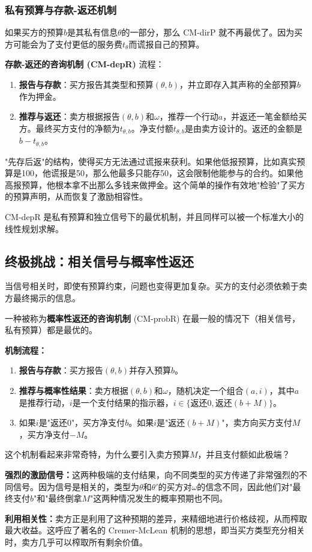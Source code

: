 \subsubsection{私有预算与存款-返还机制}

如果买方的预算$b$是其私有信息$\theta$的一部分，那么 CM-dirP 就不再最优了。因为买方可能会为了支付更低的服务费$t_\theta$而谎报自己的预算。

\textbf{存款-返还的咨询机制 (CM-depR)} 流程：

\begin{enumerate}
    \item \textbf{报告与存款}：买方报告其类型和预算$(\theta,b)$，并立即存入其声称的全部预算$b$作为押金。
    \item \textbf{推荐与返还}：卖方根据报告$(\theta,b)$和$\omega$，推荐一个行动$a$，并返还一笔金额给买方。最终买方支付的净额为$t_{\theta,b}$。净支付额$t_{\theta,b}$是由卖方设计的。返还的金额是$b-t_{\theta,b}$。
\end{enumerate}

"先存后返"的结构，使得买方无法通过谎报来获利。如果他低报预算，比如真实预算是100，他谎报是50，那么他最多只能存50，这会限制他能参与的合约。如果他高报预算，他根本拿不出那么多钱来做押金。这个简单的操作有效地"检验"了买方的预算声明，从而恢复了激励相容性。

CM-depR 是私有预算和独立信号下的最优机制，并且同样可以被一个标准大小的线性规划求解。

\subsection{终极挑战：相关信号与概率性返还}

当信号相关时，即使有预算约束，问题也变得更加复杂。买方的支付必须依赖于卖方最终揭示的信息。

一种被称为\textbf{概率性返还的咨询机制} (CM-probR) 在最一般的情况下（相关信号，私有预算）都是最优的。

\textbf{机制流程：}

\begin{enumerate}
    \item \textbf{报告与存款}：买方报告$(\theta,b)$并存入预算$b$。
    \item \textbf{推荐与概率性结果}：卖方根据$(\theta,b)$和$\omega$，随机决定一个组合$(a,i)$，其中$a$是推荐行动，$i$是一个支付结果的指示器，$i \in \{\text{返还}0, \text{返还}(b+M)\}$。
    \item 如果$i$是"返还0"，买方净支付$b$。如果$i$是"返还$(b+M)$"，卖方向买方支付$M$，买方净支付$-M$。
\end{enumerate}

这个机制看起来非常奇特，为什么要引入卖方预算$M$，并且支付额如此极端？

\textbf{强烈的激励信号：}这两种极端的支付结果，向不同类型的买方传递了非常强烈的不同信号。因为信号是相关的，类型为$\theta$和$\theta'$的买方对$\omega$的信念不同，因此他们对"最终支付$b$"和"最终倒拿$M$"这两种情况发生的概率预期也不同。

\textbf{利用相关性：}卖方正是利用了这种预期的差异，来精细地进行价格歧视，从而榨取最大收益。这呼应了著名的 Cremer-McLean 机制的思想，即当买方类型充分相关时，卖方几乎可以榨取所有剩余价值。